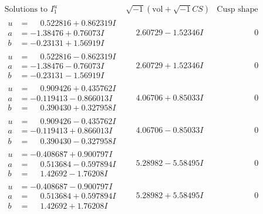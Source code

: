 \documentclass[1p]{elsarticle_modified}
\theoremstyle{definition}
\newcommand{\I}{\sqrt{-1}}
\begin{document}
$$\begin{array}{c|c|c}  
\text{Solutions to }I^u_{1}& \I (\text{vol} + \sqrt{-1}CS) & \text{Cusp shape}\\
 \hline 
\begin{aligned}
u &= \phantom{-}0.522816 + 0.862319 I \\
a &= -1.38476 + 0.76073 I \\
b &= -0.23131 + 1.56919 I\end{aligned}
 & \phantom{-}2.60729 - 1.52346 I & \phantom{-0.000000 } 0 \\ \hline\begin{aligned}
u &= \phantom{-}0.522816 - 0.862319 I \\
a &= -1.38476 - 0.76073 I \\
b &= -0.23131 - 1.56919 I\end{aligned}
 & \phantom{-}2.60729 + 1.52346 I & \phantom{-0.000000 } 0 \\ \hline\begin{aligned}
u &= \phantom{-}0.909426 + 0.435762 I \\
a &= -0.119413 - 0.866013 I \\
b &= \phantom{-}0.390430 + 0.327958 I\end{aligned}
 & \phantom{-}4.06706 + 0.85033 I & \phantom{-0.000000 } 0 \\ \hline\begin{aligned}
u &= \phantom{-}0.909426 - 0.435762 I \\
a &= -0.119413 + 0.866013 I \\
b &= \phantom{-}0.390430 - 0.327958 I\end{aligned}
 & \phantom{-}4.06706 - 0.85033 I & \phantom{-0.000000 } 0 \\ \hline\begin{aligned}
u &= -0.408687 + 0.900797 I \\
a &= \phantom{-}0.513684 - 0.597894 I \\
b &= \phantom{-}1.42692 - 1.76208 I\end{aligned}
 & \phantom{-}5.28982 - 5.58495 I & \phantom{-0.000000 } 0 \\ \hline\begin{aligned}
u &= -0.408687 - 0.900797 I \\
a &= \phantom{-}0.513684 + 0.597894 I \\
b &= \phantom{-}1.42692 + 1.76208 I\end{aligned}
 & \phantom{-}5.28982 + 5.58495 I & \phantom{-0.000000 } 0 \\ \hline\begin{aligned}

\end{aligned}
\end{array}$$
\end{document}
